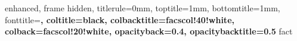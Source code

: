 






{
  enhanced,
  frame hidden,
  titlerule=0mm,
  toptitle=1mm,
  bottomtitle=1mm,
  fonttitle=\bfseries\large,
  coltitle=black,
  colbacktitle=facscol!40!white,
  colback=facscol!20!white,
  opacityback=0.4, %
  opacitybacktitle=0.5
}{fact}






\newenvironment{questions}{
  \tcolorbox[blanker,breakable,left=5mm,parbox=false,
    before upper={\parindent15pt},
    after skip=10pt,
  borderline west={1mm}{0pt}{clmscol!40!white}]
}{
  \textcolor{clmscol!40!white}{\hbox{}\nobreak\hfill$\blacksquare$}
  \endtcolorbox
}

